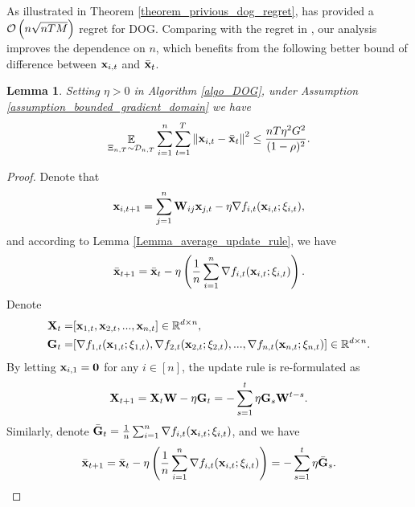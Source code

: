 \documentclass{article}
\newtheorem{Lemma}{\bf{Lemma}}
\begin{document}
As illustrated in Theorem \ref{theorem_privious_dog_regret},   \citet{8015179Shahram} has provided a ${\mathcal{O}\left( n\sqrt{nTM} \right)}$ regret for DOG. Comparing with the regret in \citet{8015179Shahram}, our analysis improves the dependence on $n$, which benefits from the following better bound of difference between ${\bf x}_{i,t}$ and $\bar{{\bf x}}_t$.
\begin{Lemma}
\label{Lemma_x_variance_norm_square}
Setting $\eta>0$ in Algorithm \ref{algo_DOG}, under Assumption \ref{assumption_bounded_gradient_domain} we have 
\begin{align}
\nonumber
\mathop{\mathbb{E}}_{ \Xi_{n,T} \sim \mathcal{D}_{n,T} } \sum_{i=1}^n\sum_{t=1}^T \left\lVert{\bf x}_{i,t} - \bar{{\bf x}}_t\right\rVert^2 \le \frac{nT\eta^2 G^2 }{(1-\rho)^2}.
\end{align}
\end{Lemma}
\begin{proof}
Denote that 
\begin{align}
\nonumber
{\bf x}_{i,t+1} = \sum_{j=1}^n {\bf W}_{ij}{\bf x}_{j,t} - \eta \nabla f_{i,t}({\bf x}_{i,t};\xi_{i,t}), 
\end{align} and according to Lemma \ref{Lemma_average_update_rule}, we have 
\begin{align}
\nonumber
\bar{{\bf x}}_{t+1} = \bar{{\bf x}}_t - \eta \left( \frac{1}{n}\sum_{i=1}^n \nabla f_{i,t}({\bf x}_{i,t};\xi_{i,t}) \right).
\end{align} Denote
\begin{align}
\nonumber
{\bf X}_t = &  [{\bf x}_{1,t}, {\bf x}_{2,t}, ..., {\bf x}_{n,t}] \in \mathbb{R}^{d\times n}, \\ \nonumber
{\bf G}_t = & [\nabla f_{1,t}({\bf x}_{1,t};\xi_{1,t}), \nabla f_{2,t}({\bf x}_{2,t};\xi_{2,t}), ..., \nabla f_{n,t}({\bf x}_{n,t};\xi_{n,t})] \in \mathbb{R}^{d\times n}.
\end{align} By letting ${\bf x}_{i,1} = {\bf 0}$ for any $i\in[n]$, the update rule is re-formulated as 
\begin{align}
\nonumber
{\bf X}_{t+1} = {\bf X}_t {\bf W} - \eta {\bf G}_t = - \sum_{s=1}^t \eta {\bf G}_s {\bf W}^{t-s}. 
\end{align} Similarly, denote $\bar{{\bf G}}_t = \frac{1}{n}\sum_{i=1}^n \nabla f_{i,t}({\bf x}_{i,t};\xi_{i,t})$, and we have
\begin{align*}
\bar{{\bf x}}_{t+1} = \bar{{\bf x}}_t - \eta \left( \frac{1}{n}\sum_{i=1}^n \nabla f_{i,t}({\bf x}_{i,t};\xi_{i,t}) \right) = - \sum_{s=1}^t \eta \bar{{\bf G}}_s. 
\end{align*}


\end{proof}
\end{document}
